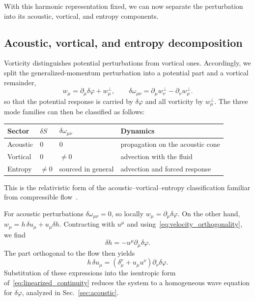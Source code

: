 \documentclass[12pt,a4paper,preprint,nopreprintline]{elsarticle}
\begin{document}
With this harmonic representation fixed, we can now separate the perturbation into its acoustic, vortical, and entropy components.

\subsection{Acoustic, vortical, and entropy decomposition}
\label{sec:mode_decomposition}

Vorticity distinguishes potential perturbations from vortical ones. Accordingly, we split the generalized-momentum perturbation into a potential part and a vortical remainder,
\begin{equation}
    w_{\mu}
    =
    \partial_{\mu}\delta\varphi+w_{\mu}^{\perp},
    \qquad
    \delta\omega_{\mu\nu}
    =
    \partial_{\mu}w_{\nu}^{\perp}
    -
    \partial_{\nu}w_{\mu}^{\perp}.
    \label{eq:helmholtz_decomposition}
\end{equation}
so that the potential response is carried by $\delta\varphi$ and all vorticity by $w_{\mu}^{\perp}$. The three mode families can then be classified as follows:
\begin{center}
    \small
    \setlength{\tabcolsep}{4pt}
    \renewcommand{\arraystretch}{1.1}
    \begin{tabularx}{\textwidth}{
        >{\raggedright\arraybackslash}p{3.0cm}
        >{\centering\arraybackslash}p{1.2cm}
        >{\centering\arraybackslash}p{3.8cm}
        >{\raggedright\arraybackslash}X}
        \toprule
        Sector & $\delta S$ & $\delta\omega_{\mu\nu}$ & Dynamics \\
        \midrule
        Acoustic & $0$ & $0$ & propagation on the acoustic cone \\
        Vortical & $0$ & $\neq0$ & advection with the fluid \\
        Entropy & $\neq0$ & sourced in general & advection and forced response \\
        \bottomrule
    \end{tabularx}
\end{center}
This is the relativistic form of the acoustic--vortical--entropy classification familiar from compressible flow~\cite{KovasznayLSG_TurbulenceInSupersonicFlow_1953}.

For acoustic perturbations $\delta\omega_{\mu\nu}=0$, so locally $w_{\mu}=\partial_{\mu}\delta\varphi$. On the other hand, $w_{\mu}=h\,\delta u_{\mu}+u_{\mu}\delta h$. Contracting with $u^{\mu}$ and using~\eqref{eq:velocity_orthogonality}, we find
\begin{equation}
    \delta h=-u^{\mu}\partial_{\mu}\delta\varphi.
    \label{eq:acoustic_enthalpy}
\end{equation}
The part orthogonal to the flow then yields
\begin{equation}
    h\,\delta u_{\mu}
    =
    \left(\delta_{\mu}^{\nu}+u_{\mu}u^{\nu}\right)
    \partial_{\nu}\delta\varphi.
    \label{eq:acoustic_fields}
\end{equation}
Substitution of these expressions into the isentropic form of~\eqref{eq:linearized_continuity} reduces the system to a homogeneous wave equation for $\delta\varphi$, analyzed in Sec.~\ref{sec:acoustic}.
\end{document}
